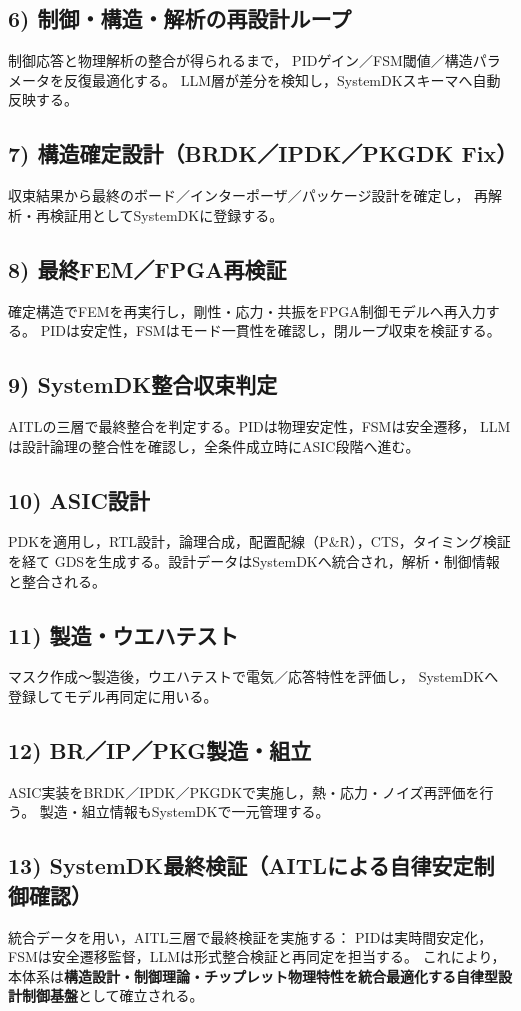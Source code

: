 \subsection{6) 制御・構造・解析の再設計ループ}
制御応答と物理解析の整合が得られるまで，
PIDゲイン／FSM閾値／構造パラメータを反復最適化する。
LLM層が差分を検知し，SystemDKスキーマへ自動反映する。

\subsection{7) 構造確定設計（BRDK／IPDK／PKGDK Fix）}
収束結果から最終のボード／インターポーザ／パッケージ設計を確定し，
再解析・再検証用としてSystemDKに登録する。

\subsection{8) 最終FEM／FPGA再検証}
確定構造でFEMを再実行し，剛性・応力・共振をFPGA制御モデルへ再入力する。
PIDは安定性，FSMはモード一貫性を確認し，閉ループ収束を検証する。

\subsection{9) SystemDK整合収束判定}
AITLの三層で最終整合を判定する。PIDは物理安定性，FSMは安全遷移，
LLMは設計論理の整合性を確認し，全条件成立時にASIC段階へ進む。

\subsection{10) ASIC設計}
PDKを適用し，RTL設計，論理合成，配置配線（P\&R），CTS，タイミング検証を経て
GDSを生成する。設計データはSystemDKへ統合され，解析・制御情報と整合される。

\subsection{11) 製造・ウエハテスト}
マスク作成～製造後，ウエハテストで電気／応答特性を評価し，
SystemDKへ登録してモデル再同定に用いる。

\subsection{12) BR／IP／PKG製造・組立}
ASIC実装をBRDK／IPDK／PKGDKで実施し，熱・応力・ノイズ再評価を行う。
製造・組立情報もSystemDKで一元管理する。

\subsection{13) SystemDK最終検証（AITLによる自律安定制御確認）}
統合データを用い，AITL三層で最終検証を実施する：
PIDは実時間安定化，FSMは安全遷移監督，LLMは形式整合検証と再同定を担当する。
これにより，本体系は\textbf{構造設計・制御理論・チップレット物理特性を統合最適化する自律型設計制御基盤}として確立される。
